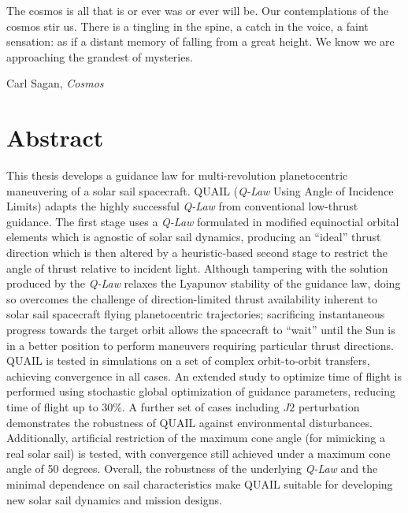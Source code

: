 \begin{titlepage}
  
\end{titlepage}

\epigraph{
  The cosmos is all that is or ever was or ever will be. Our contemplations of the cosmos stir us. There is a tingling in the spine, a catch in the voice, a faint sensation: as if a distant memory of falling from a great height. We know we are approaching the grandest of mysteries.}{Carl Sagan, \textit{Cosmos}}

\newpage

\vspace*{\fill}
\section*{Abstract}
This thesis develops a guidance law for multi-revolution planetocentric maneuvering of a solar sail spacecraft. QUAIL (\textit{Q-Law} Using Angle of Incidence Limits) adapts the highly successful \textit{Q-Law} from conventional low-thrust guidance. The first stage uses a \textit{Q-Law} formulated in modified equinoctial orbital elements which is agnostic of solar sail dynamics, producing an ``ideal'' thrust direction which is then altered by a heuristic-based second stage to restrict the angle of thrust relative to incident light. Although tampering with the solution produced by the \textit{Q-Law} relaxes the Lyapunov stability of the guidance law, doing so overcomes the challenge of direction-limited thrust availability inherent to solar sail spacecraft flying planetocentric trajectories; sacrificing instantaneous progress towards the target orbit allows the spacecraft to ``wait'' until the Sun is in a better position to perform maneuvers requiring particular thrust directions. QUAIL is tested in simulations on a set of complex orbit-to-orbit transfers, achieving convergence in all cases. An extended study to optimize time of flight is performed using stochastic global optimization of guidance parameters, reducing time of flight up to 30\%. A further set of cases including \(J2\) perturbation demonstrates the robustness of QUAIL against environmental disturbances. Additionally, artificial restriction of the maximum cone angle (for mimicking a real solar sail) is tested, with convergence still achieved under a maximum cone angle of 50 degrees. Overall, the robustness of the underlying \textit{Q-Law} and the minimal dependence on sail characteristics make QUAIL suitable for developing new solar sail dynamics and mission designs.
\vspace*{\fill}

